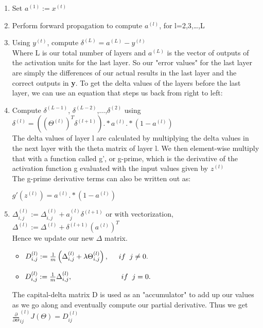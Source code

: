 \begin{enumerate}
\item Set $ a^{(1)} := x^{(t)} $\\

\item Perform forward propagation to compute $ a^{(l)} $, for l=2,3,…,L\\

\item Using $ y^{(t)} $, compute $ \delta^{(L)} = a^{(L)} - y^{(t)} $\\

Where L is our total number of layers and $ a^{(L)} $ is the vector of outputs of the activation units for the last layer. So our "error values" for the last layer are simply the differences of our actual results in the last layer and the correct outputs in \textbf{y}. To get the delta values of the layers before the last layer, we can use an equation that steps us back from right to left:\\

\item Compute $ \delta^{(L-1)} $, $ \delta^{(L-2)} $,$ \dots $,$ \delta^{(2)} $ using $ \delta^{(l)}=((\Theta^{(l)})^T\delta^{(l+1)}) .* a^{(l)} .* (1-a^{(l)}) $\\

The delta values of layer l are calculated by multiplying the delta values in the next layer with the theta matrix of layer l. We then element-wise multiply that with a function called g', or g-prime, which is the derivative of the activation function g evaluated with the input values given by $ z^{(l)} $\\

The g-prime derivative terms can also be written out as:

\begin{center}
$g'(z ^{(l)})= a ^{(l)}.* (1-a ^{(l)})$
\end{center}

\pagebreak

\item $ \Delta^{(l)}_{i,j} := \Delta^{(l)}_{i,j} + a^{(l)}_j \delta^{(l+1)}$ or with vectorization, $ \Delta^{(l)} := \Delta^{(l)} + \delta^{(l+1)}(a^{(l)})^T $\\

Hence we update our new $ \Delta $ matrix.

\begin{itemize}
\item $D _{i,j}^{(l)} := \frac{1}{m} \left(\Delta^{(l)}_{i,j} + \lambda \Theta ^{(l)}_{i,j}\right), \hspace{0.5cm} if \hspace{0.2cm} j \neq 0.$
\item $D _{i,j}^{(l)} := \frac{1}{m} \Delta^{(l)}_{i,j}, \hspace{2.4cm} if \hspace{0.2cm}j = 0.$
\end{itemize}

The capital-delta matrix D is used as an "accumulator" to add up our values as we go along and eventually compute our partial derivative. Thus we get $\frac{\partial}{\partial \Theta} ^{(l)}_{ij}J(\Theta) =  D_{ij}^{(l)} $
\end{enumerate}

